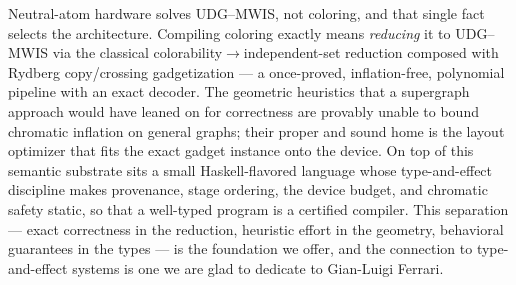 \documentclass[11pt]{article}
\theoremstyle{definition}
\theoremstyle{remark}
\begin{document}
Neutral-atom hardware solves UDG--MWIS, not coloring, and that single fact selects the
architecture. Compiling coloring exactly means \emph{reducing} it to UDG--MWIS via the
classical colorability$\to$independent-set reduction composed with Rydberg copy/crossing
gadgetization --- a once-proved, inflation-free, polynomial pipeline with an exact
decoder. The geometric heuristics that a supergraph approach would have leaned on for
correctness are provably unable to bound chromatic inflation on general graphs; their
proper and sound home is the layout optimizer that fits the exact gadget instance onto
the device. On top of this semantic substrate sits a small Haskell-flavored language
whose type-and-effect discipline makes provenance, stage ordering, the device budget, and
chromatic safety static, so that a well-typed program is a certified compiler. This
separation --- exact correctness in the reduction, heuristic effort in the geometry,
behavioral guarantees in the types --- is the foundation we offer, and the connection to
type-and-effect systems is one we are glad to dedicate to Gian-Luigi Ferrari.



\end{document}
